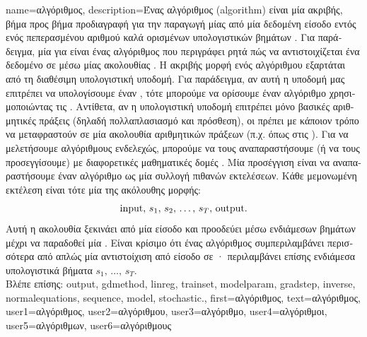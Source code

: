 {name={\foreignlanguage{greek}{αλγόριθμος}},
 	description={\foreignlanguage{greek}{Ένας} 
		\foreignlanguage{greek}{αλγόριθμος} (algorithm) \foreignlanguage{greek}{είναι μία ακριβής, βήμα προς βήμα προδιαγραφή για την  
		παραγωγή μίας}  \foreignlanguage{greek}{από μία δεδομένη είσοδο εντός ενός πεπερασμένου αριθμού 
		καλά ορισμένων υπολογιστικών βημάτων} \cite{Cormen:2022aa}. \foreignlanguage{greek}{Για παράδειγμα, μία}  
		\foreignlanguage{greek}{για}  \foreignlanguage{greek}{είναι ένας αλγόριθμος που περιγράφει ρητά πώς να 
		αντιστοιχίζεται ένα δεδομένο}  \foreignlanguage{greek}{σε}  
		\foreignlanguage{greek}{μέσω μίας ακολουθίας} . \foreignlanguage{greek}{Η ακριβής μορφή ενός αλγόριθμου 
		εξαρτάται από τη διαθέσιμη υπολογιστική υποδομή. Για παράδειγμα, αν αυτή η υποδομή μας επιτρέπει να υπολογίσουμε 
		έναν} , \foreignlanguage{greek}{τότε μπορούμε να ορίσουμε έναν αλγόριθμο}  
		\foreignlanguage{greek}{χρησιμοποιώντας τις} . \foreignlanguage{greek}{Αντίθετα, αν η 
		υπολογιστική υποδομή επιτρέπει μόνο βασικές αριθμητικές πράξεις (δηλαδή πολλαπλασιασμό και πρόσθεση), οι}
		 \foreignlanguage{greek}{πρέπει με κάποιον τρόπο να μεταφραστούν σε μία ακολουθία αριθμητικών 
		πράξεων (π.χ. όπως στις} ). \foreignlanguage{greek}{Για να μελετήσουμε αλγόριθμους ενδελεχώς, μπορούμε 
		να τους αναπαραστήσουμε (ή να τους προσεγγίσουμε) με διαφορετικές μαθηματικές δομές} \cite{Sipser2013}. 
		\foreignlanguage{greek}{Μία προσέγγιση είναι να αναπαραστήσουμε έναν αλγόριθμο ως μία συλλογή πιθανών εκτελέσεων. Κάθε 
		μεμονωμένη εκτέλεση είναι τότε μία}  \foreignlanguage{greek}{της ακόλουθης μορφής}:
		$${\rm input}, \,s_1, \,s_2, \,\ldots, \,s_T, \,{\rm output}.$$  
		\foreignlanguage{greek}{Αυτή η ακολουθία ξεκινάει από μία είσοδο και προοδεύει μέσω ενδιάμεσων βημάτων μέχρι να παραδοθεί μία} 
		. \foreignlanguage{greek}{Είναι κρίσιμο ότι ένας αλγόριθμος συμπεριλαμβάνει περισσότερα από απλώς μία 
		αντιστοίχιση από είσοδο σε} · \foreignlanguage{greek}{περιλαμβάνει επίσης ενδιάμεσα υπολογιστικά βήματα} 
		$s_1, \,\ldots, \,s_T$.
		\\
		\foreignlanguage{greek}{Βλέπε επίσης:} \gls{output}, \gls{gdmethod}, \gls{linreg}, \gls{trainset}, \gls{modelparam}, \gls{gradstep}, \gls{inverse}, 
		\gls{normalequations}, \gls{sequence}, \gls{model}, \gls{stochastic}.},
	first={\foreignlanguage{greek}{αλγόριθμος}},
	text={\foreignlanguage{greek}{αλγόριθμος}},
	user1={\foreignlanguage{greek}{αλγόριθμος}}, %
	user2={\foreignlanguage{greek}{αλγόριθμου}}, %
	user3={\foreignlanguage{greek}{αλγόριθμο}}, %
	user4={\foreignlanguage{greek}{αλγόριθμοι}}, %
	user5={\foreignlanguage{greek}{αλγόριθμων}}, %
	user6={\foreignlanguage{greek}{αλγόριθμους}} %
}

